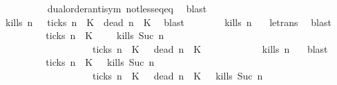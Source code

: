 \begin{isabellebody}
\ \ \ \ \ \ \ \ \isamarkupfalse%
\ dual{\isacharunderscore}order{\isachardot}antisym\ not{\isacharunderscore}less{\isacharunderscore}eq{\isacharunderscore}eq\ \isamarkupfalse%
\ blast\isanewline
\ \ \ \ \ \ \isamarkupfalse%
\ \isamarkupfalse%
\ {\isacartoucheopen}{\isacharquery}kills\ n\ {\isasymrho}\ {\isasymor}\ {\isacharquery}ticks\ n\ {\isasymrho}\ K\ {\isasymand}\ {\isacharquery}dead\ n\ {\isasymrho}\ K\ \isamarkupfalse%
\ blast\isanewline
\ \ \ \ \ \ \isamarkupfalse%
\ {\isacartoucheopen}{\isacharquery}kills\ n\ {\isasymrho}{\isacartoucheclose}\ \isamarkupfalse%
\ le{\isacharunderscore}trans\ \isamarkupfalse%
\ blast\isanewline
\ \ \ \ \isacommand{{\isacharbraceright}}\isamarkupfalse%
\ \isamarkupfalse%
\ {\isacartoucheopen}{\isacharparenleft}{\isacharbraceleft}{\isasymrho}{\isachardot}\ {\isasymnot}\ {\isacharquery}ticks\ n\ {\isasymrho}\ K\ \ {\isasyminter}\ {\isacharbraceleft}\ {\isasymrho}{\isachardot}\ {\isacharquery}kills\ {\isacharparenleft}Suc\ n{\isacharparenright}\ {\isasymrho}{\isacharbraceright}{\isacharparenright}\isanewline
\ \ \ \ \ \ \ \ \ \ \ \ \ \ \ \ \ {\isasymunion}\ {\isacharparenleft}{\isacharbraceleft}{\isasymrho}{\isachardot}\ {\isacharquery}ticks\ n\ {\isasymrho}\ K\ {\isasyminter}\ {\isacharbraceleft}{\isasymrho}{\isachardot}\ {\isacharquery}dead\ n\ {\isasymrho}\ K\isanewline
\ \ \ \ \ \ \ \ \ \ {\isasymsubseteq}\ {\isacharbraceleft}{\isasymrho}{\isachardot}\ {\isacharquery}kills\ n\ {\isasymrho}{\isacharbraceright}{\isacartoucheclose}\ \isamarkupfalse%
\ blast\isanewline
\ \ \isamarkupfalse%
\isanewline
\ \ \isamarkupfalse%
\ \isamarkupfalse%
\ {\isacartoucheopen}{\isachardot}{\isachardot}{\isachardot}\ {\isacharequal}\ {\isacharbraceleft}{\isasymrho}{\isachardot}\ {\isasymnot}\ {\isacharquery}ticks\ n\ {\isasymrho}\ K\ {\isasyminter}\ {\isacharbraceleft}{\isasymrho}{\isachardot}\ {\isacharquery}kills\ {\isacharparenleft}Suc\ n{\isacharparenright}\ {\isasymrho}{\isacharbraceright}\isanewline
\ \ \ \ \ \ \ \ \ \ \ \ \ \ \ \ \ {\isasymunion}\ {\isacharbraceleft}{\isasymrho}{\isachardot}\ {\isacharquery}ticks\ n\ {\isasymrho}\ K\ {\isasyminter}\ {\isacharbraceleft}{\isasymrho}{\isachardot}\ {\isacharquery}dead\ n\ {\isasymrho}\ K\ {\isasyminter}\ {\isacharbraceleft}{\isasymrho}{\isachardot}\ {\isacharquery}kills\ {\isacharparenleft}Suc\ n{\isacharparenright}\ {\isasymrho}{\isacharbraceright}{\isacartoucheclose}\isanewline

\end{isabellebody}
